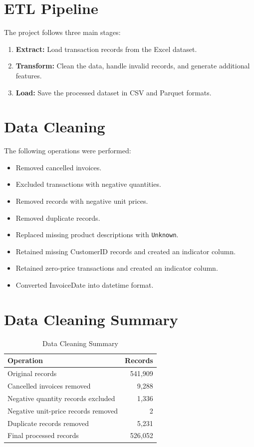 \documentclass[12pt,a4paper]{report}
\begin{document}
\section{ETL Pipeline}

The project follows three main stages:

\begin{enumerate}
    \item \textbf{Extract:} Load transaction records
    from the Excel dataset.
    \item \textbf{Transform:} Clean the data, handle
    invalid records, and generate additional features.
    \item \textbf{Load:} Save the processed dataset
    in CSV and Parquet formats.
\end{enumerate}

\section{Data Cleaning}

The following operations were performed:

\begin{itemize}
    \item Removed cancelled invoices.
    \item Excluded transactions with negative quantities.
    \item Removed records with negative unit prices.
    \item Removed duplicate records.
    \item Replaced missing product descriptions with
    \texttt{Unknown}.
    \item Retained missing CustomerID records and
    created an indicator column.
    \item Retained zero-price transactions and
    created an indicator column.
    \item Converted InvoiceDate into datetime format.
\end{itemize}

\section{Data Cleaning Summary}

\begin{table}[H]
\centering
\begin{tabular}{lr}
\toprule
\textbf{Operation} & \textbf{Records}\\
\midrule
Original records & 541,909\\
Cancelled invoices removed & 9,288\\
Negative quantity records excluded & 1,336\\
Negative unit-price records removed & 2\\
Duplicate records removed & 5,231\\
\midrule
Final processed records & 526,052\\
\bottomrule
\end{tabular}
\caption{Data Cleaning Summary}
\end{table}
\end{document}
